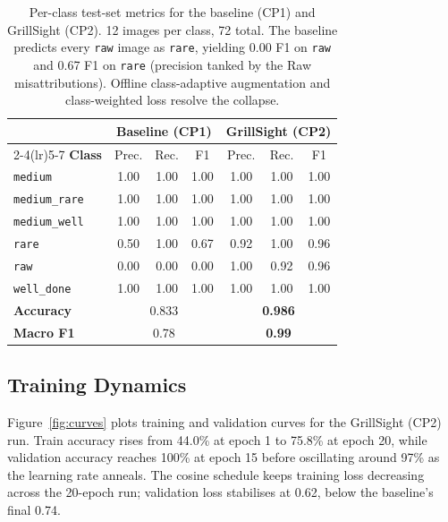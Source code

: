 \documentclass{article}
\begin{document}
\begin{table}[t]
\caption{Per-class test-set metrics for the baseline (CP1) and GrillSight
(CP2). 12 images per class, 72 total. The baseline predicts every
\texttt{raw} image as \texttt{rare}, yielding 0.00 F1 on \texttt{raw} and
0.67 F1 on \texttt{rare} (precision tanked by the Raw misattributions).
Offline class-adaptive augmentation and class-weighted loss resolve the
collapse.}
\label{tab:results}
\begin{center}
\small
\begin{tabular}{lcccccc}
\toprule
& \multicolumn{3}{c}{\textbf{Baseline (CP1)}} & \multicolumn{3}{c}{\textbf{GrillSight (CP2)}} \\
\cmidrule(lr){2-4}\cmidrule(lr){5-7}
\textbf{Class} & Prec. & Rec. & F1 & Prec. & Rec. & F1 \\
\midrule
\texttt{medium}       & 1.00 & 1.00 & 1.00 & 1.00 & 1.00 & 1.00 \\
\texttt{medium\_rare} & 1.00 & 1.00 & 1.00 & 1.00 & 1.00 & 1.00 \\
\texttt{medium\_well} & 1.00 & 1.00 & 1.00 & 1.00 & 1.00 & 1.00 \\
\texttt{rare}         & 0.50 & 1.00 & 0.67 & 0.92 & 1.00 & 0.96 \\
\texttt{raw}          & 0.00 & 0.00 & 0.00 & 1.00 & 0.92 & 0.96 \\
\texttt{well\_done}   & 1.00 & 1.00 & 1.00 & 1.00 & 1.00 & 1.00 \\
\midrule
\textbf{Accuracy}     & \multicolumn{3}{c}{0.833} & \multicolumn{3}{c}{\textbf{0.986}} \\
\textbf{Macro F1}     & \multicolumn{3}{c}{0.78}  & \multicolumn{3}{c}{\textbf{0.99}}  \\
\bottomrule
\end{tabular}
\end{center}
\end{table}

\subsection{Training Dynamics}

Figure~\ref{fig:curves} plots training and validation curves for the
GrillSight (CP2) run. Train accuracy rises from 44.0\% at epoch 1 to 75.8\%
at epoch 20, while validation accuracy reaches 100\% at epoch 15 before
oscillating around 97\% as the learning rate anneals. The cosine schedule
keeps training loss decreasing across the 20-epoch run;
validation loss stabilises at 0.62, below the baseline's final 0.74.
\end{document}
